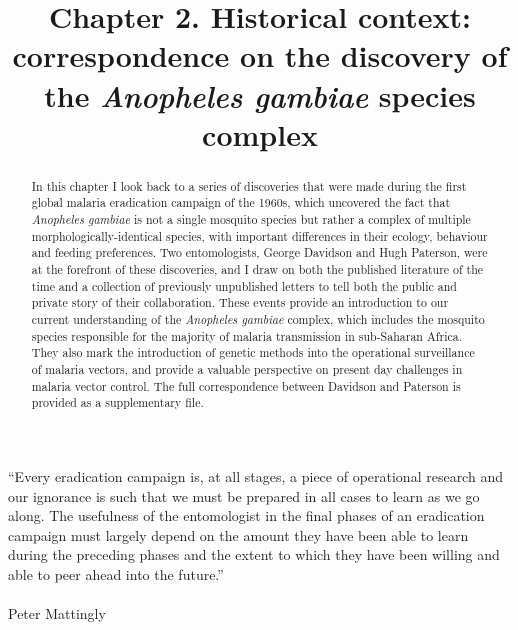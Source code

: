 \documentclass[a4paper,11pt,abstracton,hidelinks]{scrartcl}
\title{
Chapter 2. Historical context: correspondence on the discovery of the \textit{Anopheles gambiae} species complex
}
\author{}
\begin{document}
\renewcommand{\abstractname}{Summary}


\maketitle


\begin{displayquote}
``Every eradication campaign is, at all stages, a piece of operational research and our ignorance is such that we must be prepared in all cases to learn as we go along. The usefulness of the entomologist in the final phases of an eradication campaign must largely depend on the amount they have been able to learn during the preceding phases and the extent to which they have been willing and able to peer ahead into the future.'' \\\\ Peter Mattingly \citeyearpar{Mattingly1963}
\end{displayquote}



\begin{abstract}


In this chapter I look back to a series of discoveries that were made during the first global malaria eradication campaign of the 1960s, which uncovered the fact that \textit{Anopheles gambiae} is not a single mosquito species but rather a complex of multiple morphologically-identical species, with important differences in their ecology, behaviour and feeding preferences. 
%
Two entomologists, George Davidson and Hugh Paterson, were at the forefront of these discoveries, and I draw on both the published literature of the time and a collection of previously unpublished letters to tell both the public and private story of their collaboration.
%
These events provide an introduction to our current understanding of the \textit{Anopheles gambiae} complex, which includes the mosquito species responsible for the majority of malaria transmission in sub-Saharan Africa.
%
They also mark the introduction of genetic methods into the operational surveillance of malaria vectors, and provide a valuable perspective on present day challenges in malaria vector control.
%
The full correspondence between Davidson and Paterson is provided as a supplementary file.


\end{abstract}
\end{document}
